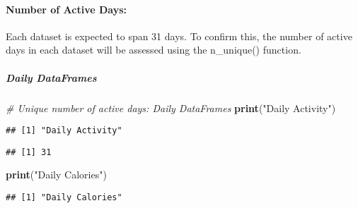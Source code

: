 \documentclass[
]{article}
\newenvironment{Shaded}{\begin{snugshade}}{\end{snugshade}}
\newcommand{\CommentTok}[1]{\textcolor[rgb]{0.56,0.35,0.01}{\textit{#1}}}
\newcommand{\FunctionTok}[1]{\textcolor[rgb]{0.13,0.29,0.53}{\textbf{#1}}}
\newcommand{\NormalTok}[1]{#1}
\newcommand{\SpecialCharTok}[1]{\textcolor[rgb]{0.81,0.36,0.00}{\textbf{#1}}}
\newcommand{\StringTok}[1]{\textcolor[rgb]{0.31,0.60,0.02}{#1}}
\begin{document}
\hypertarget{number-of-active-days}{%
\paragraph{Number of Active Days:}\label{number-of-active-days}}

Each dataset is expected to span 31 days. To confirm this, the number of
active days in each dataset will be assessed using the n\_unique()
function.

\hypertarget{daily-dataframes-3}{%
\subparagraph{Daily DataFrames}\label{daily-dataframes-3}}

\begin{Shaded}
\begin{Highlighting}[]
\CommentTok{\# Unique number of active days: Daily DataFrames}
\FunctionTok{print}\NormalTok{(}\StringTok{"Daily Activity"}\NormalTok{)}
\end{Highlighting}
\end{Shaded}

\begin{verbatim}
## [1] "Daily Activity"
\end{verbatim}

\begin{Shaded}
\end{Shaded}

\begin{verbatim}
## [1] 31
\end{verbatim}

\begin{Shaded}
\begin{Highlighting}[]
\FunctionTok{print}\NormalTok{(}\StringTok{"Daily Calories"}\NormalTok{)}
\end{Highlighting}
\end{Shaded}

\begin{verbatim}
## [1] "Daily Calories"
\end{verbatim}

\begin{Shaded}
\end{Shaded}
\end{document}
